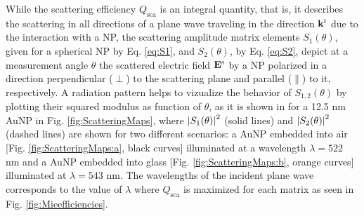 While the scattering efficiency $Q_\text{sca}$ is an integral quantity, that is, it describes the scattering in all directions of a plane wave traveling in the  direction $\vb{k}^\text{i}$ due to the interaction with a NP, the scattering amplitude matrix elements $S_1(\theta)$,  given  for a spherical NP by Eq. \eqref{eq:S1}, and  $S_2(\theta)$, by Eq. \eqref{eq:S2}, depict at a measurement angle $\theta$ the  scattered electric field $\vb{E}^\text{s}$ by a NP polarized in a direction perpendicular ($\perp$) to the scattering plane and parallel ($\parallel$) to it, respectively. A radiation pattern helps to vizualize the behavior of $S_{1,2}(\theta)$ by plotting their squared modulus as function of $\theta$, as it is shown in for a 12.5 nm AuNP in Fig. \ref{fig:ScatteringMaps}, where $\abs{S_{1}(\theta)}^2$ (solid lines) and $\abs{S_2(\theta)}^2$ (dashed lines) are shown for two different scenarios: a AuNP embedded into air [Fig. \ref{fig:ScatteringMaps:a}, black curves]  illuminated  at a wavelength $\lambda = 522$ nm and a AuNP embedded into glass  [Fig. \ref{fig:ScatteringMaps:b}, orange curves]  illuminated at $\lambda = 543$ nm. The wavelengths of the incident plane wave corresponds to the value of $\lambda$ where $Q_\text{sca}$ is maximized for each matrix as seen in Fig. \ref{fig:Mieefficiencies}.

